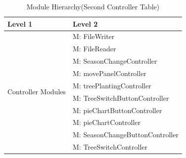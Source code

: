 \documentclass[12pt, titlepage]{article}
\newcounter{mnum}
\newcommand{\mthemnum}{M\themnum}
\begin{document}
\newpage
\begin{table}[H]
\caption{Module Hierarchy(Second Controller Table)}
\label{TblControllers}

\centering
\begin{tabular}{p{} p{}}
\toprule
\textbf{Level 1} & \textbf{Level 2}\\
\midrule

\multirow{18}{0.3\textwidth}{Controller Modules}

& {mnum} \mthemnum \label{Controller19}: FileWriter \\
& {mnum} \mthemnum \label{Controller20}: FileReader \\
& {mnum} \mthemnum \label{Controller21}: SeasonChangeController \\
& {mnum} \mthemnum \label{Controller22}: movePanelController \\
& {mnum} \mthemnum \label{Controller23}: treePlantingController \\
& {mnum} \mthemnum \label{Controller24}: TreeSwitchButtonController \\
& {mnum} \mthemnum \label{Controller25}: pieChartButtonController \\
& {mnum} \mthemnum \label{Controller26}: pieChartController \\
& {mnum} \mthemnum \label{Controller27}: SeasonChangeButtonController \\
& {mnum} \mthemnum \label{Controller28}: TreeSwitchController \\
\bottomrule

\end{tabular}

\end{table}

\newpage
\end{document}
